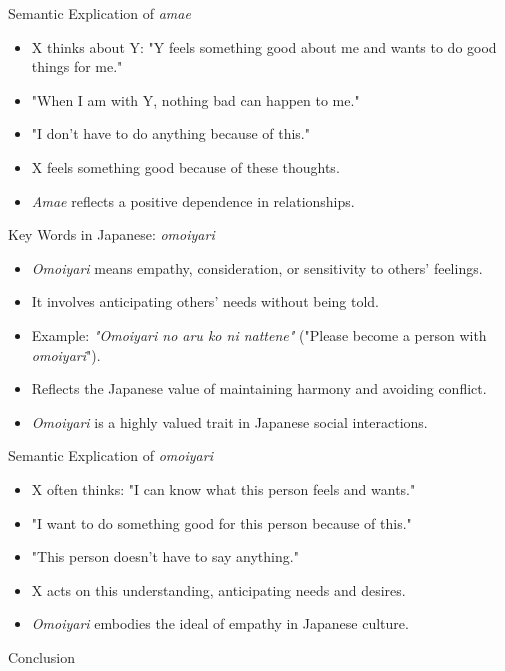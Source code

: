 \documentclass{beamer}
\begin{document}
\begin{frame}{Semantic Explication of \textit{amae}}
    \begin{itemize}
        \item X thinks about Y: "Y feels something good about me and wants to do good things for me."
        \item "When I am with Y, nothing bad can happen to me."
        \item "I don't have to do anything because of this."
        \item X feels something good because of these thoughts.
        \item \textit{Amae} reflects a positive dependence in relationships.
    \end{itemize}
\end{frame}

\begin{frame}{Key Words in Japanese: \textit{omoiyari}}
    \begin{itemize}
        \item \textit{Omoiyari} means empathy, consideration, or sensitivity to others' feelings.
        \item It involves anticipating others' needs without being told.
        \item Example: \textit{"Omoiyari no aru ko ni nattene"} ("Please become a person with \textit{omoiyari}").
        \item Reflects the Japanese value of maintaining harmony and avoiding conflict.
        \item \textit{Omoiyari} is a highly valued trait in Japanese social interactions.
    \end{itemize}
\end{frame}

\begin{frame}{Semantic Explication of \textit{omoiyari}}
    \begin{itemize}
        \item X often thinks: "I can know what this person feels and wants."
        \item "I want to do something good for this person because of this."
        \item "This person doesn't have to say anything."
        \item X acts on this understanding, anticipating needs and desires.
        \item \textit{Omoiyari} embodies the ideal of empathy in Japanese culture.
    \end{itemize}
\end{frame}


\begin{frame}{Conclusion}
  
\end{frame}
\end{document}
